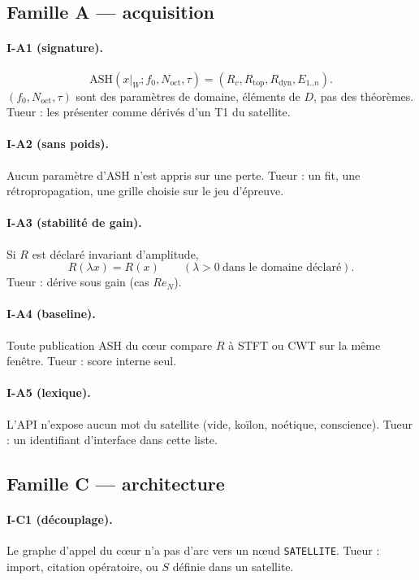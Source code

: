 \documentclass[11pt,a4paper]{article}
\theoremstyle{definition}
\begin{document}
\subsection{Famille A --- acquisition}

\paragraph{I-A1 (signature).}
\[
\mathrm{ASH}(x|_{W};f_{0},N_{\mathrm{oct}},\tau)
=
(R_{c},R_{\mathrm{top}},R_{\mathrm{dyn}},E_{1..n}).
\]
$(f_{0},N_{\mathrm{oct}},\tau)$ sont des paramètres de domaine, éléments de $D$, pas des théorèmes.
Tueur : les présenter comme dérivés d'un T1 du satellite.

\paragraph{I-A2 (sans poids).}
Aucun paramètre d'ASH n'est appris sur une perte.
Tueur : un fit, une rétropropagation, une grille choisie sur le jeu d'épreuve.

\paragraph{I-A3 (stabilité de gain).}
Si $R$ est déclaré invariant d'amplitude,
\[
R(\lambda x)=R(x)\qquad(\lambda>0\ \text{dans le domaine déclaré}).
\]
Tueur : dérive sous gain (cas $Re_{N}$).

\paragraph{I-A4 (baseline).}
Toute publication ASH du cœur compare $R$ à STFT ou CWT sur la même fenêtre.
Tueur : score interne seul.

\paragraph{I-A5 (lexique).}
L'API n'expose aucun mot du satellite (vide, koïlon, noétique, conscience).
Tueur : un identifiant d'interface dans cette liste.

\subsection{Famille C --- architecture}

\paragraph{I-C1 (découplage).}
Le graphe d'appel du cœur n'a pas d'arc vers un nœud \texttt{SATELLITE}.
Tueur : import, citation opératoire, ou $S$ définie dans un satellite.
\end{document}
